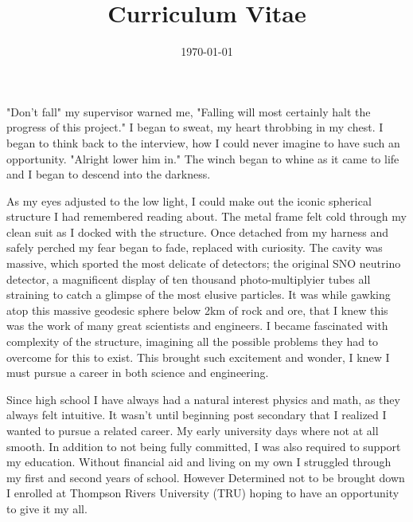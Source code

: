 \documentclass[11pt,a4paper,sans]{moderncv} %
\title{Curriculum Vitae}
\begin{document}


\clearpage

\date{\today} %
\opening{} %
\closing{} %

\makelettertitle %

"Don't fall" my supervisor warned me, "Falling will most certainly halt the progress of this project." I began to sweat, my heart throbbing in my chest. I began to think back to the interview, how I could never imagine to have such an opportunity. "Alright lower him in." The winch began to whine as it came to life and I began to descend into the darkness.

 As my eyes adjusted to the low light, I could make out the iconic spherical structure I had remembered reading about. The metal frame felt cold through my clean suit as I docked with the structure. Once detached from my harness and safely perched my fear began to fade, replaced with curiosity. The cavity was massive, which sported the most delicate of detectors; the original SNO neutrino detector, a magnificent display of ten thousand photo-multiplyier tubes all straining to catch a glimpse of the most elusive particles. It was while gawking atop this massive geodesic sphere below 2km of rock and ore, that I knew this was the work of many great scientists and engineers. I became fascinated with complexity of the structure, imagining all the possible problems they had to overcome for this to exist. This brought such excitement and wonder, I knew I must pursue a career in both science and engineering. 

 Since high school I have always had a natural interest physics and math, as they always felt intuitive. It wasn't until beginning post secondary that I realized I wanted to pursue a related career. My early university days where not at all smooth. In addition to not being fully committed, I was also required to support my education. Without financial aid and living on my own I struggled through my first and second years of school. However Determined not to be brought down I enrolled at Thompson Rivers University (TRU) hoping to have an opportunity to give it my all.
\end{document}
